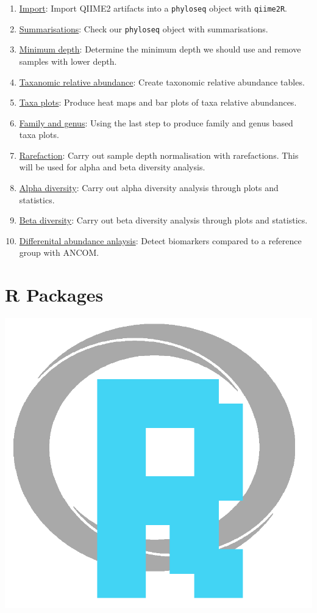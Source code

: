 \documentclass[
]{book}
\providecommand{\tightlist}{%
  \setlength{\itemsep}{0pt}\setlength{\parskip}{0pt}}
\begin{document}
\begin{enumerate}
\def\labelenumi{\arabic{enumi}.}
\tightlist
\item
  \protect\hyperlink{import_chap}{Import}: Import QIIME2 artifacts into a \texttt{phyloseq} object with \texttt{qiime2R}.
\item
  \protect\hyperlink{sum_phyloseq_chap}{Summarisations}: Check our \texttt{phyloseq} object with summarisations.
\item
  \protect\hyperlink{mindepthchap}{Minimum depth}: Determine the minimum depth we should use and remove samples with lower depth.
\item
  \protect\hyperlink{taxa_relabund_chap}{Taxanomic relative abundance}: Create taxonomic relative abundance tables.
\item
  \protect\hyperlink{chaptaxaplots}{Taxa plots}: Produce heat maps and bar plots of taxa relative abundances.
\item
  \protect\hyperlink{family_genus_chap}{Family and genus}: Using the last step to produce family and genus based taxa plots.
\item
  \protect\hyperlink{rarefaction_chap}{Rarefaction}: Carry out sample depth normalisation with rarefactions. This will be used for alpha and beta diversity analysis.
\item
  \protect\hyperlink{alpha_chap}{Alpha diversity}: Carry out alpha diversity analysis through plots and statistics.
\item
  \protect\hyperlink{beta_chap}{Beta diversity}: Carry out beta diversity analysis through plots and statistics.
\item
  \protect\hyperlink{DA_chap}{Differenital abundance anlaysis}: Detect biomarkers compared to a reference group with ANCOM.
\end{enumerate}

\hypertarget{rpackchap}{%
\chapter{R Packages}\label{rpackchap}}

\includegraphics{figures/R.png}
\end{document}
